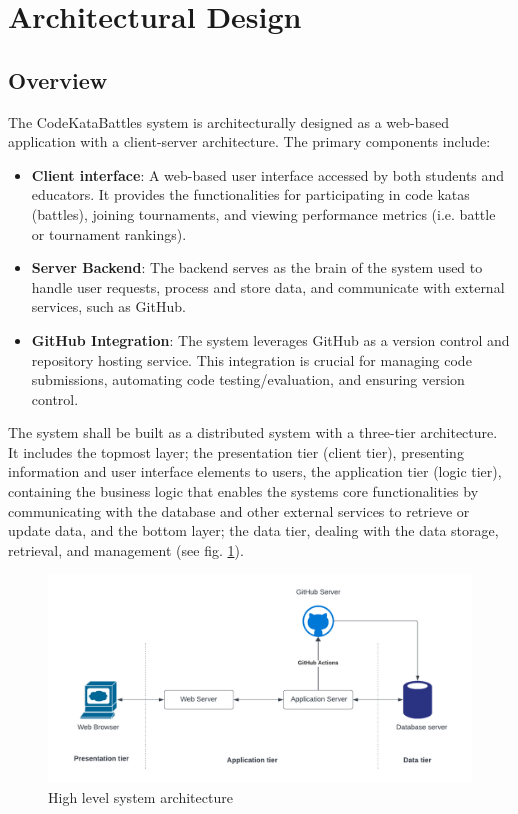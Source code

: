 \section{Architectural Design}
\subsection{Overview}
The CodeKataBattles system is architecturally designed as a web-based application with a client-server architecture. The primary components include:
\begin{itemize}
    \item \textbf{Client interface}: A web-based user interface accessed by both students and educators. It provides the functionalities for participating in code katas (battles), joining tournaments, and viewing performance metrics (i.e. battle or tournament rankings).
    \item \textbf{Server Backend}: The backend serves as the brain of the system used to handle user requests, process and store data, and communicate with external services, such as GitHub. 
 
    \item \textbf{GitHub Integration}: The system leverages GitHub as a version control and repository hosting service. This integration is crucial for managing code submissions, automating code testing/evaluation, and ensuring version control.
\end{itemize}

The system shall be built as a distributed system with a three-tier architecture. It includes the topmost layer; the presentation tier (client tier), presenting information and user interface elements to users, the application tier (logic tier), containing the business logic that enables the systems core functionalities by communicating with the database and other external services to retrieve or update data, and the bottom layer; the data tier, dealing with the data storage, retrieval, and management (see fig. \ref{fig:3tierArchitecture}).


\begin{figure}[H]
    \centering
    \includegraphics[width=\textwidth]{Graphics/Architecture/3-tier architecture.png}
    \caption{High level system architecture}
    \label{fig:3tierArchitecture}
\end{figure}

